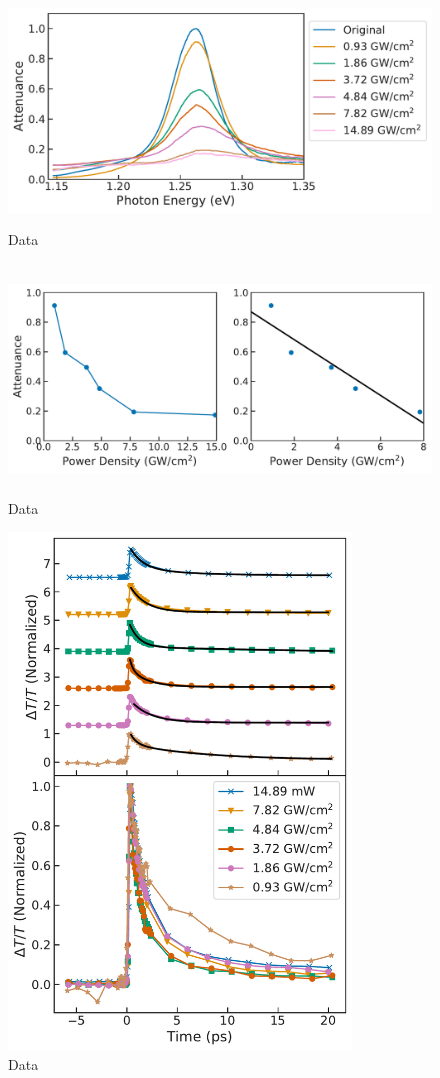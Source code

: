 \begin{figure}[ht]
	\centering
	\includegraphics[height=2.4in]{images/chapter_my_data/Weilu_CNT_abs_max_change}
	\caption{Data}
\end{figure}

\begin{figure}[ht]
	\centering
	\includegraphics[height=2.4in]{images/chapter_my_data/Weilu_CNT_max_attenuance_and_fit}
	\caption{Data}
\end{figure}

\begin{figure}[ht]
	\centering
	\includegraphics[height=5.4in]{images/chapter_my_data/Weilu_CNT_diff_trans_fits_and_normalized}
	\caption{Data}
\end{figure}




